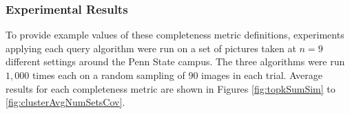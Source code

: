 \subsubsection{Experimental Results}

To provide example values of these completeness metric definitions, experiments applying each query algorithm were run on a set of pictures taken at $n=9$ different settings around the Penn State campus.  The three algorithms were run $1,000$ times each on a random sampling of $90$ images in each trial.  Average results for each completeness metric are shown in Figures \ref{fig:topkSumSim} to \ref{fig:clusterAvgNumSetsCov}.



